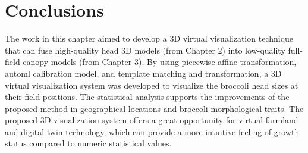 \section{Conclusions}

The work in this chapter aimed to develop a 3D virtual visualization technique that can fuse high-quality head 3D models (from Chapter 2) into low-quality full-field canopy models (from Chapter 3). By using piecewise affine transformation, \gls{automl} calibration model, and template matching and transformation, a 3D virtual visualization system was developed to visualize the broccoli head sizes at their field positions. The statistical analysis supports the improvements of the proposed method in geographical locations and broccoli morphological traits. The proposed 3D visualization system offers a great opportunity for virtual farmland and digital twin technology, which can provide a more intuitive feeling of growth status compared to numeric statistical values.